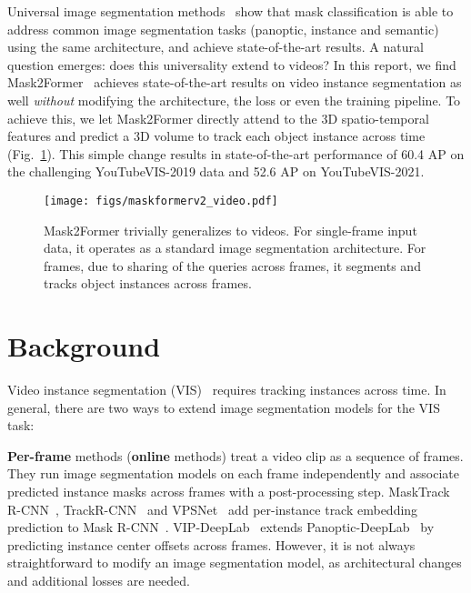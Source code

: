 \documentclass[10pt,twocolumn,letterpaper]{article}
\newcommand{\modelname}{Mask2Former\xspace}
\begin{document}
Universal image segmentation methods~\cite{cheng2021maskformer,cheng2021mask2former} show that mask classification is able to address common image segmentation tasks (\ie panoptic, instance and semantic) using the same architecture, and achieve state-of-the-art results. 
A natural question emerges: does this universality extend to videos? In this report, we find  \modelname~\cite{cheng2021mask2former} achieves state-of-the-art results on video instance segmentation as well \emph{without} modifying the architecture, the loss or even the training pipeline. 
To achieve this, we let \modelname directly attend to the 3D spatio-temporal features and predict a 3D volume to track each object instance across time (Fig.~\ref{fig:teaser}). This simple change results in state-of-the-art performance of 60.4 AP on the challenging YouTubeVIS-2019 data and 52.6 AP on YouTubeVIS-2021.


\begin{figure}
    \centering
    \texttt{[image: figs/maskformerv2\_video.pdf]}
    \caption{\modelname trivially generalizes to videos. For  single-frame input data, it operates as a standard image segmentation architecture. For  frames, due to sharing of the queries across  frames, it  segments and tracks  object instances across  frames.}
    \label{fig:teaser}
\end{figure}

\section{Background}
Video instance segmentation (VIS)~\cite{yang2019video} requires tracking instances across time. In general, there are two ways to extend image segmentation models for the VIS task:

\noindent\textbf{Per-frame} methods (\aka \textbf{online} methods) treat a video clip as a sequence of frames. They run image segmentation models on each frame independently and associate predicted instance masks across frames with a post-processing step. MaskTrack R-CNN~\cite{yang2019video}, TrackR-CNN~\cite{voigtlaender2019mots} and VPSNet~\cite{kim2020video} add per-instance track embedding prediction to Mask R-CNN~\cite{he2017mask}. VIP-DeepLab~\cite{qiao2021vip} extends Panoptic-DeepLab~\cite{cheng2020panoptic} by predicting instance center offsets across frames. 
However, it is not always straightforward to modify an image segmentation model, as architectural changes and additional losses are needed.
\end{document}
